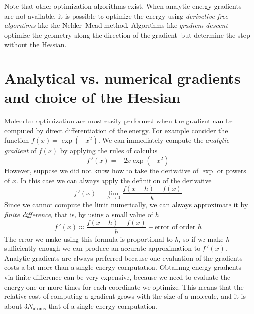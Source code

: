 \documentclass[../Main/chem371-notes.tex]{subfiles}
\begin{document}
Note that other optimization algorithms exist.
When analytic energy gradients are not available, it is possible to optimize the energy using \emph{derivative-free algorithms} like the Nelder--Mead method.
Algorithms like \emph{gradient descent} optimize the geometry along the direction of the gradient, but determine the step without the Hessian.

\section{Analytical vs. numerical gradients and choice of the Hessian}
Molecular optimization are most easily performed when the gradient can be computed by direct differentiation of the energy.
For example consider the function $f(x) = \exp(-x^2)$.
We can immediately compute the \emph{analytic gradient} of $f(x)$ by applying the rules of calculus
\begin{equation}
f\,'(x) = -2 x \exp(-x^2)
\end{equation}
However, suppose we did not know how to take the derivative of $\exp$ or powers of $x$. In this case we can always apply the definition of the derivative
\begin{equation}
f\,'(x) = \lim_{h \rightarrow 0} \frac{f(x + h) - f(x)}{h}
\end{equation}
Since we cannot compute the limit numerically, we can always approximate it by \emph{finite difference}, that is, by using a small value of $h$
\begin{equation}
f\,'(x) \approx \frac{f(x + h) - f(x)}{h} + \text{error of order } h
\end{equation}
The error we make using this formula is proportional to $h$, so if we make $h$ sufficiently enough we can produce an accurate approximation to $f\,'(x)$.
Analytic gradients are always preferred because one evaluation of the gradients costs a bit more than a single energy computation.
Obtaining energy gradients via finite difference can be very expensive, because we need to evaluate the energy one or more times for each  coordinate we optimize. This means that the relative cost of computing a gradient grows with the size of a molecule, and it is about 3$N_\mathrm{atoms}$ that of a single energy computation.
\end{document}
